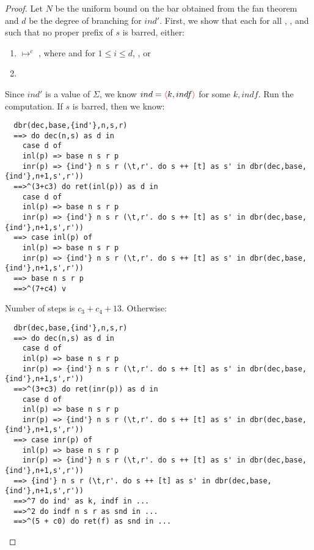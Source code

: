 \begin{proof}
  Let $N$ be the uniform bound on the bar obtained from the fan theorem and $d$ be the degree of branching for 
  $ind'$.
  First, we show that each for all , , and 
   such that no proper prefix of $s$ is barred, either: 
  \begin{enumerate}
    \item {} $\mapsto^c$
        , 
      where  and  for $1 \le i \le d$, 
      , or 
    \item {}
  \end{enumerate}
  Since $ind'$ is a value of $\Sigma$, we know $ind = {\textcolor{red}{\langle}} k,indf {\textcolor{red}{\rangle}}$ for some $k,indf$.
  Run the computation. If $s$ is barred, then we know:
  \begin{verbatim}
  dbr(dec,base,{ind'},n,s,r) 
  ==> do dec(n,s) as d in 
    case d of
    inl(p) => base n s r p 
    inr(p) => {ind'} n s r (\t,r'. do s ++ [t] as s' in dbr(dec,base,{ind'},n+1,s',r')) 
  ==>^(3+c3) do ret(inl(p)) as d in 
    case d of
    inl(p) => base n s r p 
    inr(p) => {ind'} n s r (\t,r'. do s ++ [t] as s' in dbr(dec,base,{ind'},n+1,s',r')) 
  ==> case inl(p) of
    inl(p) => base n s r p 
    inr(p) => {ind'} n s r (\t,r'. do s ++ [t] as s' in dbr(dec,base,{ind'},n+1,s',r')) 
  ==> base n s r p
  ==>^(7+c4) v
  \end{verbatim}
  Number of steps is $c_3 + c_4 + 13$.
  Otherwise: 
  \begin{verbatim}
  dbr(dec,base,{ind'},n,s,r) 
  ==> do dec(n,s) as d in 
    case d of
    inl(p) => base n s r p 
    inr(p) => {ind'} n s r (\t,r'. do s ++ [t] as s' in dbr(dec,base,{ind'},n+1,s',r')) 
  ==>^(3+c3) do ret(inr(p)) as d in 
    case d of
    inl(p) => base n s r p 
    inr(p) => {ind'} n s r (\t,r'. do s ++ [t] as s' in dbr(dec,base,{ind'},n+1,s',r')) 
  ==> case inr(p) of
    inl(p) => base n s r p 
    inr(p) => {ind'} n s r (\t,r'. do s ++ [t] as s' in dbr(dec,base,{ind'},n+1,s',r')) 
  ==> {ind'} n s r (\t,r'. do s ++ [t] as s' in dbr(dec,base,{ind'},n+1,s',r')) 
  ==>^7 do ind' as k, indf in ... 
  ==>^2 do indf n s r as snd in ...
  ==>^(5 + c0) do ret(f) as snd in ...

\end{verbatim}
\end{proof}
